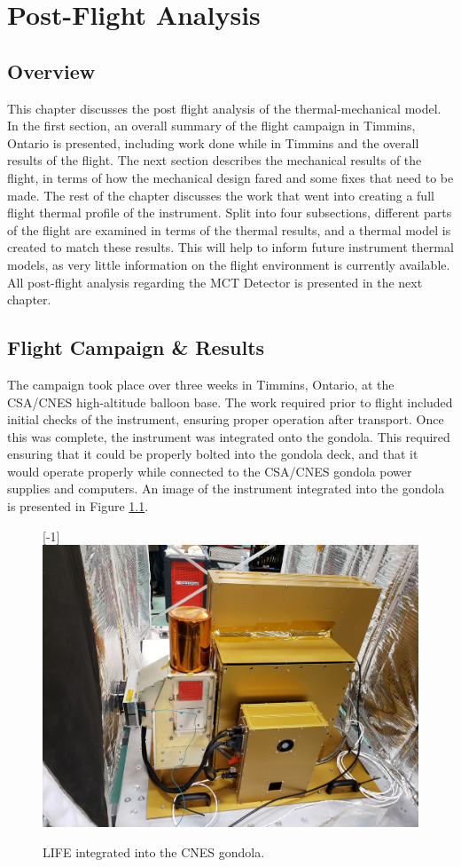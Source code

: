 \chapter{Post-Flight Analysis} \label{postflight}

\section{Overview}
This chapter discusses the post flight analysis of the thermal-mechanical model. In the first section, an overall summary of the flight campaign in Timmins, Ontario is presented, including work done while in Timmins and the overall results of the flight. The next section describes the mechanical results of the flight, in terms of how the mechanical design fared and some fixes that need to be made. The rest of the chapter discusses the work that went into creating a full flight thermal profile of the instrument. Split into four subsections, different parts of the flight are examined in terms of the thermal results, and a thermal model is created to match these results. This will help to inform future instrument thermal models, as very little information on the flight environment is currently available. All post-flight analysis regarding the MCT Detector is presented in the next chapter.

\section{Flight Campaign \& Results}
The campaign took place over three weeks in Timmins, Ontario, at the CSA/CNES high-altitude balloon base. The work required prior to flight included initial checks of the instrument, ensuring proper operation after transport. Once this was complete, the instrument was integrated onto the gondola. This required ensuring that it could be properly bolted into the gondola deck, and that it would operate properly while connected to the CSA/CNES gondola power supplies and computers. An image of the instrument integrated into the gondola is presented in Figure \ref{fig:LIFE_ON_GONDOLA}.

\begin{figure}
    \centering
    \scalebox{1}[-1]{\includegraphics[width=0.7\linewidth]{chap4_images/LIFE_on_gondola.jpg}}
    \caption{LIFE integrated into the CNES gondola.}
    \label{fig:LIFE_ON_GONDOLA}
\end{figure}


